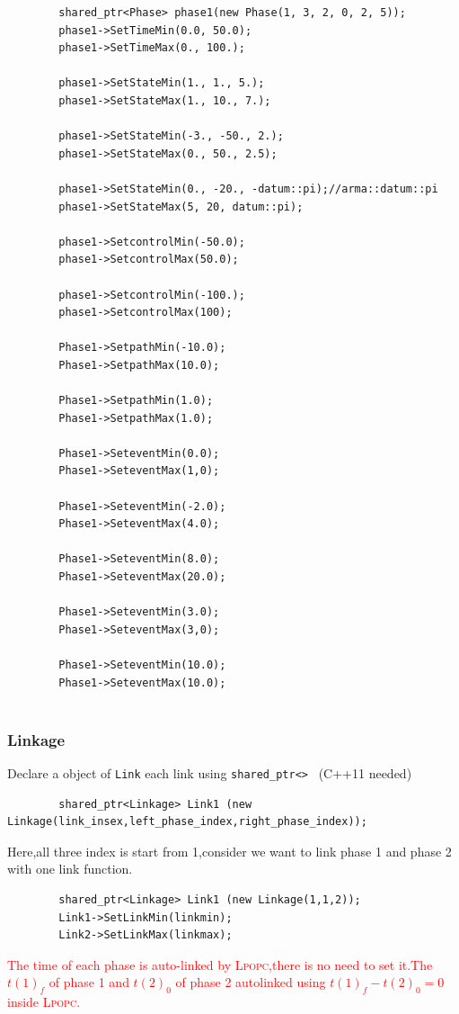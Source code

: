 \documentclass[10pt]{article}
\newcommand{\LPOPC}{\textsc{Lpopc}\xspace}
\begin{document}
    	\begin{lstlisting}
    	shared_ptr<Phase> phase1(new Phase(1, 3, 2, 0, 2, 5));
    	phase1->SetTimeMin(0.0, 50.0);
    	phase1->SetTimeMax(0., 100.);
    	
    	phase1->SetStateMin(1., 1., 5.);
    	phase1->SetStateMax(1., 10., 7.);
    	
    	phase1->SetStateMin(-3., -50., 2.);
    	phase1->SetStateMax(0., 50., 2.5);
    	
    	phase1->SetStateMin(0., -20., -datum::pi);//arma::datum::pi
    	phase1->SetStateMax(5, 20, datum::pi);
    	
    	phase1->SetcontrolMin(-50.0);
    	phase1->SetcontrolMax(50.0);
    	
    	phase1->SetcontrolMin(-100.);
    	phase1->SetcontrolMax(100);
    	
    	Phase1->SetpathMin(-10.0);
    	Phase1->SetpathMax(10.0);
    	
    	Phase1->SetpathMin(1.0);
    	Phase1->SetpathMax(1.0);
    	
    	Phase1->SeteventMin(0.0);
    	Phase1->SeteventMax(1,0);
    	
    	Phase1->SeteventMin(-2.0);
    	Phase1->SeteventMax(4.0);
    	
    	Phase1->SeteventMin(8.0);
    	Phase1->SeteventMax(20.0);
    	
    	Phase1->SeteventMin(3.0);
    	Phase1->SeteventMax(3,0);
    	
    	Phase1->SeteventMin(10.0);
    	Phase1->SeteventMax(10.0);
    	
    	\end{lstlisting}
    	\subsubsection{Linkage}
    	Declare a object of \lstinline|Link| each link using \lstinline|shared_ptr<>| \ (C++11 needed)\\
    	\begin{lstlisting}
    	shared_ptr<Linkage> Link1 (new Linkage(link_insex,left_phase_index,right_phase_index));
    	\end{lstlisting}
    	Here,all three index is start from 1,consider we want to link phase 1 and phase 2 with one link function.
    	\begin{lstlisting}
    	shared_ptr<Linkage> Link1 (new Linkage(1,1,2));
    	Link1->SetLinkMin(linkmin);
    	Link2->SetLinkMax(linkmax);
    	\end{lstlisting}
    	\textcolor{red}{The time of each phase is auto-linked by \LPOPC,there is no need to set it.The $t(1)_f$ of phase 1 and $t(2)_0$ of phase 2 autolinked using $t(1)_f-t(2)_0=0$ inside \LPOPC.}
\end{document}
